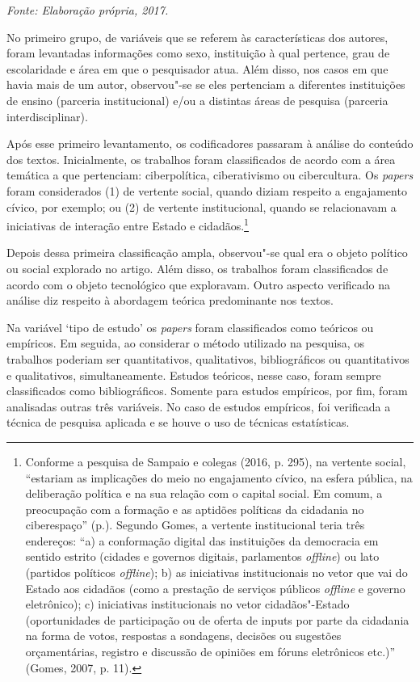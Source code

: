 \begin{center}
{\footnotesize\emph{Fonte: Elaboração própria, 2017.}}
\end{center}

No primeiro grupo, de variáveis que se referem às características dos
autores, foram levantadas informações como sexo, instituição à qual
pertence, grau de escolaridade e área em que o pesquisador atua.
Além disso, nos casos em que havia mais de um autor, observou"-se se
eles pertenciam a diferentes instituições de ensino (parceria
institucional) e/ou a distintas áreas de pesquisa (parceria
interdisciplinar).

Após esse primeiro levantamento, os codificadores passaram à análise do
conteúdo dos textos. Inicialmente, os trabalhos foram classificados de
acordo com a área temática a que pertenciam: ciberpolítica,
ciberativismo ou cibercultura. Os \emph{papers} foram considerados (1)
de vertente social, quando diziam respeito a engajamento cívico, por
exemplo; ou (2) de vertente institucional, quando se relacionavam a
iniciativas de interação entre Estado e cidadãos.\footnote{Conforme a
  pesquisa de Sampaio e colegas (2016, p. 295), na vertente social,
  ``estariam as implicações do meio no engajamento cívico, na esfera
  pública, na deliberação política e na sua relação com o capital
  social. Em comum, a preocupação com a formação e as aptidões políticas
  da cidadania no ciberespaço'' (p.). Segundo Gomes, a vertente
  institucional teria três endereços: ``a) a conformação digital das
  instituições da democracia em sentido estrito (cidades e governos
  digitais, parlamentos \emph{offline}) ou lato (partidos políticos \emph{offline});
  b) as iniciativas institucionais no vetor que vai do Estado aos
  cidadãos (como a prestação de serviços públicos \emph{offline} e governo
  eletrônico); c) iniciativas institucionais no vetor cidadãos"-Estado
  (oportunidades de participação ou de oferta de inputs por parte da
  cidadania na forma de votos, respostas a sondagens, decisões ou
  sugestões orçamentárias, registro e discussão de opiniões em fóruns
  eletrônicos etc.)'' (Gomes, 2007, p. 11).}

Depois dessa primeira classificação ampla, observou"-se qual era o objeto
político ou social explorado no artigo. Além disso, os trabalhos foram
classificados de acordo com o objeto tecnológico que exploravam. Outro
aspecto verificado na análise diz respeito à abordagem teórica
predominante nos textos.

Na variável `tipo de estudo' os \emph{papers} foram classificados como
teóricos ou empíricos. Em seguida, ao considerar o método utilizado na
pesquisa, os trabalhos poderiam ser quantitativos, qualitativos,
bibliográficos ou quantitativos e qualitativos, simultaneamente. Estudos
teóricos, nesse caso, foram sempre classificados como bibliográficos.
Somente para estudos empíricos, por fim, foram analisadas outras três
variáveis. No caso de estudos empíricos, foi verificada a técnica de
pesquisa aplicada e se houve o uso de técnicas estatísticas.

